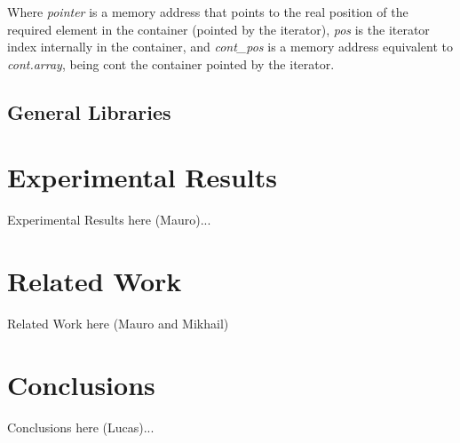 \documentclass[a4paper]{llncs}
\begin{document}
	Where \textit{pointer} is a memory address that points to the real position of the required element in the container (pointed by the iterator), \textit{pos} is the iterator index internally in the container, and \textit{cont\_pos} is a memory address equivalent to \textit{cont.array}, being cont the container pointed by the iterator.

%
\subsection{General Libraries}


\section{Experimental Results}
%
Experimental Results here (Mauro)...



\section{Related Work}
%
Related Work here (Mauro and Mikhail)

\section{Conclusions}
%
Conclusions here (Lucas)...


\end{document}
